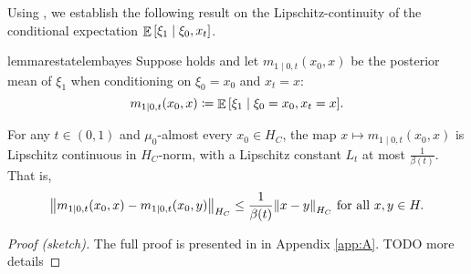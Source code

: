 Using , we establish the following result on the Lipschitz-continuity of the conditional expectation \(\mathop{\mathbb{E}}\qty[ \xi_{1} \mid \xi_{0}, x_{t}]\).

\begin{restatable}{lemma}{restatelembayes}\label{lem:bayes}
  Suppose  holds and let \(m_{1 \mid 0, t}(x_{0}, x)\) be the posterior mean of \(\xi_{1}\) when conditioning on \(\xi_{0} = x_{0}\) and \(x_{t} = x\):
  \[
    m_{1 \mid 0, t}(x_{0}, x) \coloneqq \mathop{\mathbb{E}}\qty[ \xi_{1} \mid \xi_{0} = x_{0}, x_{t} = x ].
  \]

  For any \(t \in (0, 1)\) and \(\mu_{0}\)-almost every \(x_{0} \in H_{C}\), the map \(x \mapsto m_{1 \mid 0, t}(x_{0}, x)\) is Lipschitz continuous in \(H_{C}\)-norm, with a Lipschitz constant \(L_{t}\) at most \(\frac{1}{\beta(t)}\). That is,
  \[
    \norm{m_{1 \mid 0, t}(x_{0}, x) - m_{1 \mid 0, t}(x_{0}, y)}_{H_{C}} \leq \frac{1}{\beta(t)}\norm{x - y}_{H_{C}} \text{ for all } x, y \in H.
  \]
\end{restatable}
\begin{proof}[Proof (sketch)]
  The full proof is presented in  in Appendix \ref{app:A}. TODO more details
\end{proof}






